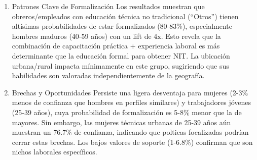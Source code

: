 \documentclass[Royal,times,sageh]{sagej}
\begin{document}
\begin{table}
\centering
\caption{\label{tab:unnamed-chunk-9}Top 10 reglas asociadas a la tenencia de NIT entre asalariados con nivel educativo 'Otros'}
\centering
{}
\end{table}

\begin{enumerate}
\def\labelenumi{\arabic{enumi}.}
\item
  Patrones Clave de Formalización Los resultados muestran que
  obreros/empleados con educación técnica no tradicional (``Otros'')
  tienen altísimas probabilidades de estar formalizados (80-83\%),
  especialmente hombres maduros (40-59 años) con un lift de 4x. Esto
  revela que la combinación de capacitación práctica + experiencia
  laboral es más determinante que la educación formal para obtener NIT.
  La ubicación urbana/rural impacta mínimamente en este grupo,
  sugiriendo que sus habilidades son valoradas independientemente de la
  geografía.
\item
  Brechas y Oportunidades Persiste una ligera desventaja para mujeres
  (2-3\% menos de confianza que hombres en perfiles similares) y
  trabajadores jóvenes (25-39 años), cuya probabilidad de formalización
  es 5-8\% menor que la de mayores. Sin embargo, las mujeres técnicas
  urbanas de 25-39 años aún muestran un 76.7\% de confianza, indicando
  que polticas focalizadas podrían cerrar estas brechas. Los bajos
  valores de soporte (1-6.8\%) confirman que son nichos laborales
  específicos.
\end{enumerate}
\end{document}
